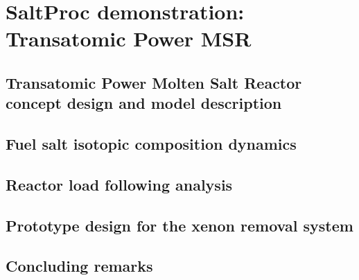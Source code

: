 \chapter[Tool demonstration: Transatomic Power MSR]{SaltProc 
demonstration: Transatomic Power MSR}

\section{Transatomic Power Molten Salt Reactor concept design and model 
description}

\section{Fuel salt isotopic composition dynamics}

\section{Reactor load following analysis}

\section{Prototype design for the xenon removal system}

\section{Concluding remarks}